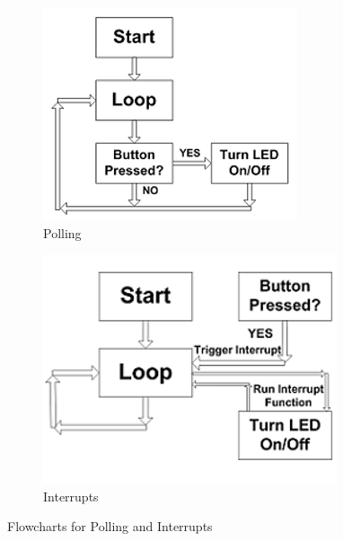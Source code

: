 \documentclass[12pt]{article}
\begin{document}
\begin{figure}
     \centering
     \begin{subfigure}{0.45\textwidth}
         \centering
         \includegraphics[width=\textwidth]{polling.png}
         \caption{Polling}
         \label{fig:polling}
     \end{subfigure}
     \hfill
     \begin{subfigure}{0.45\textwidth}
         \centering
         \includegraphics[width=\textwidth]{interrupts.png}
         \caption{Interrupts}
         \label{fig:interrupts}
     \end{subfigure}
     \caption{Flowcharts for Polling and Interrupts}
     \label{fig:polling and interrupts}
\end{figure}
\end{document}
